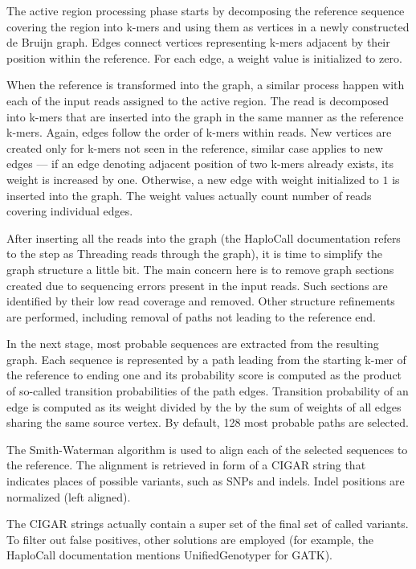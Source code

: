 The active region processing phase starts by decomposing the reference sequence covering the region into k-mers and using them as vertices in a newly constructed de Bruijn graph. Edges connect vertices representing k-mers adjacent by their position within the reference. For each edge, a weight value is initialized to zero.

When the reference is transformed into the graph, a similar process happen with each of the input reads assigned to the active region. The read is decomposed into k-mers that are inserted into the graph in the same manner as the reference k-mers. Again, edges follow the order of k-mers within reads.  New vertices are created only for k-mers not seen in the reference, similar case applies to new edges --- if an edge denoting adjacent position of two k-mers already exists, its weight is increased by one. Otherwise, a new edge with weight initialized to $1$ is inserted into the graph. The weight values actually count number of reads covering individual edges.

After inserting all the reads into the graph (the HaploCall documentation refers to the step as Threading reads through the graph), it is time to simplify the graph structure a little bit. The main concern here is to remove graph sections created due to sequencing errors present in the input reads. Such sections are identified by their low read coverage and removed. Other structure refinements are performed, including removal of paths not leading to the reference end.

In the next stage, most probable sequences are extracted from the resulting graph. Each sequence is represented by a path leading from the starting k-mer of the reference to ending one and its probability score is computed as the product of so-called transition probabilities of the path edges. Transition probability of an edge is computed as its weight divided by the by the sum of weights of all edges sharing the same source vertex. By default, 128 most probable paths are selected.

The Smith-Waterman algorithm is used to align each of the selected sequences to the reference. The alignment is retrieved in form of a CIGAR string that indicates places of possible variants, such as SNPs and indels. Indel positions are normalized (left aligned). 

The CIGAR strings actually contain a super set of the final set of called variants. To filter out false positives, other solutions are employed (for example, the HaploCall documentation mentions UnifiedGenotyper for GATK).


